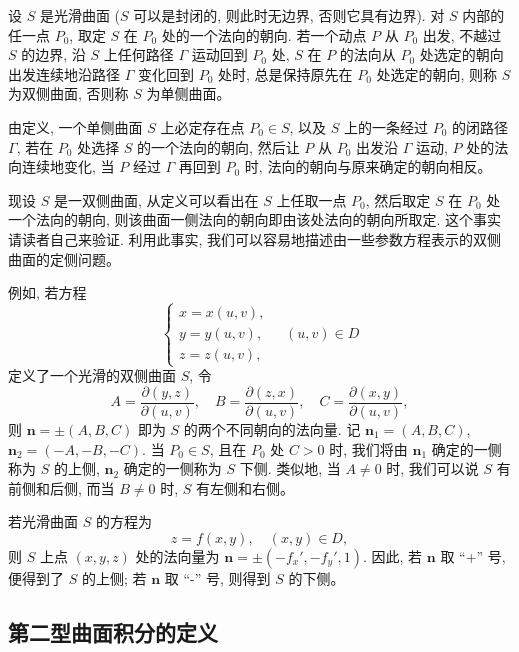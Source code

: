 \documentclass[UTF8,12pt,a4paper,fontset=fandol]{ctexart}
\begin{document}
\begin{definition}\label{course-definition-16-4-1}\quad 设 $S$ 是光滑曲面 ($S$ 可以是封闭的, 则此时无边界, 否则它具有边界). 对 $S$ 内部的任一点 $P_0$, 取定 $S$ 在 $P_0$ 处的一个法向的朝向. 若一个动点 $P$ 从 $P_0$ 出发, 不越过 $S$ 的边界, 沿 $S$ 上任何路径 $\Gamma$ 运动回到 $P_0$ 处, $S$ 在 $P$ 的法向从 $P_0$ 处选定的朝向出发连续地沿路径 $\Gamma$ 变化回到 $P_0$ 处时, 总是保持原先在 $P_0$ 处选定的朝向, 则称 $S$ 为双侧曲面, 否则称 $S$ 为单侧曲面。

由定义, 一个单侧曲面 $S$ 上必定存在点 $P_0\in S$, 以及 $S$ 上的一条经过 $P_0$ 的闭路径 $\Gamma$, 若在 $P_0$ 处选择 $S$ 的一个法向的朝向, 然后让 $P$ 从 $P_0$ 出发沿 $\Gamma$ 运动, $P$ 处的法向连续地变化, 当 $P$ 经过 $\Gamma$ 再回到 $P_0$ 时, 法向的朝向与原来确定的朝向相反。

现设 $S$ 是一双侧曲面, 从定义可以看出在 $S$ 上任取一点 $P_0$, 然后取定 $S$ 在 $P_0$ 处一个法向的朝向, 则该曲面一侧法向的朝向即由该处法向的朝向所取定. 这个事实请读者自己来验证. 利用此事实, 我们可以容易地描述由一些参数方程表示的双侧曲面的定侧问题。

例如, 若方程
\[
  \begin{cases}
    x=x(u,v),\\
    y=y(u,v),\\
    z=z(u,v),
  \end{cases}\quad (u,v)\in D
\]
定义了一个光滑的双侧曲面 $S$, 令
\begin{equation}
  A=\frac{\partial(y,z)}{\partial(u,v)},\quad
  B=\frac{\partial(z,x)}{\partial(u,v)},\quad
  C=\frac{\partial(x,y)}{\partial(u,v)},
  \label{course-eq-16-4-1}
\end{equation}
则 $\boldsymbol n=\pm(A,B,C)$ 即为 $S$ 的两个不同朝向的法向量. 记 $\boldsymbol n_1=(A,B,C)$, $\boldsymbol n_2=(-A,-B,-C)$. 当 $P_0\in S$, 且在 $P_0$ 处 $C>0$ 时, 我们将由 $\boldsymbol n_1$ 确定的一侧称为 $S$ 的上侧, $\boldsymbol n_2$ 确定的一侧称为 $S$ 下侧. 类似地, 当 $A\ne0$ 时, 我们可以说 $S$ 有前侧和后侧, 而当 $B\ne0$ 时, $S$ 有左侧和右侧。

若光滑曲面 $S$ 的方程为
\[
  z=f(x,y),\quad (x,y)\in D,
\]
则 $S$ 上点 $(x,y,z)$ 处的法向量为 $\boldsymbol n=\pm(-f_x',-f_y',1)$. 因此, 若 $\boldsymbol n$ 取 ``+'' 号, 便得到了 $S$ 的上侧; 若 $\boldsymbol n$ 取 ``-'' 号, 则得到 $S$ 的下侧。

\end{definition}
\subsection{第二型曲面积分的定义}
\end{document}
